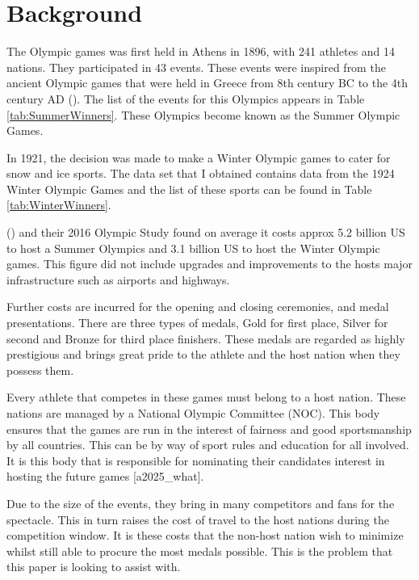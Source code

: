 \documentclass[
]{article}
\begin{document}
\newpage

\section*{Background}\label{background}

The Olympic games was first held in Athens in 1896, with 241 athletes and 14 nations. They participated in 43 events. These events were inspired from the ancient Olympic games that were held in Greece from 8th century BC to the 4th century AD (). The list of the events for this Olympics appears in Table \ref{tab:SummerWinners}. These Olympics become known as the Summer Olympic Games.

In 1921, the decision was made to make a Winter Olympic games to cater for snow and ice sports. The data set that I obtained contains data from the 1924 Winter Olympic Games and the list of these sports can be found in Table \ref{tab:WinterWinners}.

() and their 2016 Olympic Study found on average it costs approx 5.2 billion US to host a Summer Olympics and 3.1 billion US to host the Winter Olympic games. This figure did not include upgrades and improvements to the hosts major infrastructure such as airports and highways.

Further costs are incurred for the opening and closing ceremonies, and medal presentations. There are three types of medals, Gold for first place, Silver for second and Bronze for third place finishers. These medals are regarded as highly prestigious and brings great pride to the athlete and the host nation when they possess them.

Every athlete that competes in these games must belong to a host nation. These nations are managed by a National Olympic Committee (NOC). This body ensures that the games are run in the interest of fairness and good sportsmanship by all countries. This can be by way of sport rules and education for all involved. It is this body that is responsible for nominating their candidates interest in hosting the future games {[}a2025\_what{]}.

Due to the size of the events, they bring in many competitors and fans for the spectacle. This in turn raises the cost of travel to the host nations during the competition window. It is these costs that the non-host nation wish to minimize whilst still able to procure the most medals possible. This is the problem that this paper is looking to assist with.
\end{document}
